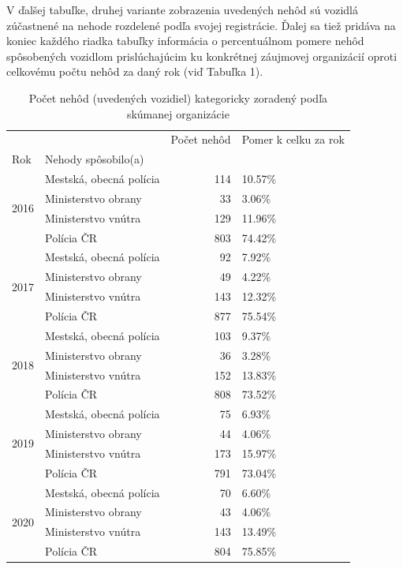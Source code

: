\documentclass{article}
\begin{document}
\pagebreak

V ďalšej tabuľke, druhej variante zobrazenia uvedených nehôd sú vozidlá zúčastnené na nehode
rozdelené podľa svojej registrácie.
Ďalej sa tiež pridáva na koniec každého riadka tabuľky informácia o percentuálnom pomere nehôd spôsobených vozidlom
prislúchajúcim ku konkrétnej záujmovej organizácií oproti celkovému počtu nehôd za daný rok (viď Tabuľka 1).

\begin{table}[htb]
\caption{Počet nehôd (uvedených vozidiel) kategoricky zoradený podľa skúmanej organizácie}
\begin{center}
\begin{tabular}{llrl}
\toprule
 &  & Počet nehôd & Pomer k celku za rok \\
Rok & Nehody spôsobilo(a) &  &  \\
\midrule
\multirow[t]{4}{*}{2016} & Mestská, obecná polícia & 114 & 10.57\% \\
 & Ministerstvo obrany & 33 & 3.06\% \\
 & Ministerstvo vnútra & 129 & 11.96\% \\
 & Polícia ČR & 803 & 74.42\% \\
\cline{1-4}
\multirow[t]{4}{*}{2017} & Mestská, obecná polícia & 92 & 7.92\% \\
 & Ministerstvo obrany & 49 & 4.22\% \\
 & Ministerstvo vnútra & 143 & 12.32\% \\
 & Polícia ČR & 877 & 75.54\% \\
\cline{1-4}
\multirow[t]{4}{*}{2018} & Mestská, obecná polícia & 103 & 9.37\% \\
 & Ministerstvo obrany & 36 & 3.28\% \\
 & Ministerstvo vnútra & 152 & 13.83\% \\
 & Polícia ČR & 808 & 73.52\% \\
\cline{1-4}
\multirow[t]{4}{*}{2019} & Mestská, obecná polícia & 75 & 6.93\% \\
 & Ministerstvo obrany & 44 & 4.06\% \\
 & Ministerstvo vnútra & 173 & 15.97\% \\
 & Polícia ČR & 791 & 73.04\% \\
\cline{1-4}
\multirow[t]{4}{*}{2020} & Mestská, obecná polícia & 70 & 6.60\% \\
 & Ministerstvo obrany & 43 & 4.06\% \\
 & Ministerstvo vnútra & 143 & 13.49\% \\
 & Polícia ČR & 804 & 75.85\% \\

\end{tabular}
\end{center}
\end{table}
\end{document}
